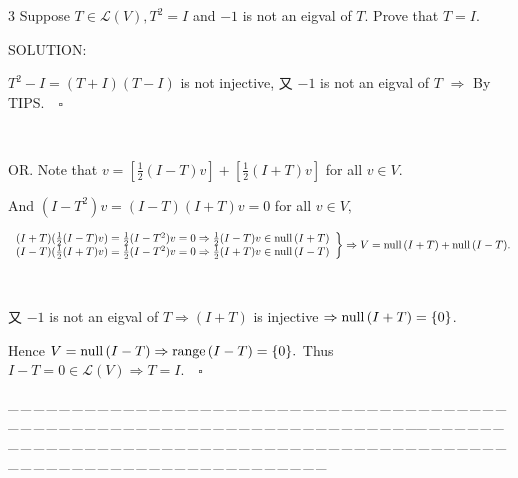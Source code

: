 \documentclass[a4paper, 11pt, UTF8]{article}
\def\range{\textup{range}\,}
\def\null{\textup{null\,}}
\def\Lm{\mathcal{L}}
\begin{document}
\begin{large}
{\timesbf\Large 3} {\timessl\Large 
Suppose $T\in\Lm(V),T^2=I$ and $-1$ is not an eigval of $T.$ Prove that $T=I.$
}\par
{\timesbf S\footnotesize{OLUTION:}}\par\quad
$T^2-I=(T+I)(T-I)$ is not injective, 又 $-1$ is not an eigval of $T$ $\Rightarrow$ By T{\small IPS}.$\quad\square$\par{\tiny\,\par}\quad
O{\small R.} Note that $v=[\frac{1}{2}(I-T)v]+[\frac{1}{2}(I+T)v]$ for all $v\in V.$\par\quad
And $(I-T^2)v=(I-T)(I+T)v=0$ for all $v\in V,$\par\quad
$\left.\begin{array}{l}
(I+T)(\frac{1}{2}(I-T)v)=\frac{1}{2}(I-T^2)v=0\Rightarrow \frac{1}{2}(I-T)v\in\null(I+T)\\
(I-T)(\frac{1}{2}(I+T)v)=\frac{1}{2}(I-T^2)v=0\Rightarrow \frac{1}{2}(I+T)v\in\null(I-T)
\end{array}\right\}\Rightarrow V=\null(I+T)+\null(I-T).$\par{\tiny\,\par}\quad
又 $-1$ is not an eigval of $T\Rightarrow (I+T)$ is injective $\Rightarrow\null(I+T)=\{0\}$.\par\quad
Hence $V=\null(I-T)\Rightarrow\range(I-T)=\{0\}.$ Thus $I-T=0\in\Lm(V)\Rightarrow T=I.\quad\square$\par
{\tiny \_\,\_\,\_\,\_\,\_\,\_\,\_\,\_\,\_\,\_\,\_\,\_\,\_\,\_\,\_\,\_\,\_\,\_\,\_\,\_\,\_\,\_\,\_\,\_\,\_\,\_\,\_\,\_\,\_\,\_\,\_\,\_\,\_\,\_\,\_\,\_\,\_\,\_\,\_\,\_\,\_\,\_\,\_\,\_\,\_\,\_\,\_\,\_\,\_\,\_\,\_\,\_\,\_\,\_\,\_\,\_\,\_\,\_\,\_\,\_\,\_\,\_\,\_\,\_\,\_\,\_\,\_\,\_\,\_\,\_\,\_\_\,\_\,\_\,\_\,\_\,\_\,\_\,\_\,\_\,\_\,\_\,\_\,\_\,\_\,\_\,\_\,\_\,\_\,\_\,\_\,\_\,\_\,\_\,\_\,\_\,\_\,\_\,\_\,\_\,\_\,\_\,\_\,\_\,\_\,\_\,\_\,\_\,\_\,\_\,\_\,\_\,\_\,\_\,\_\,\_\,\_\,\_\,\_\,\_\,\_\,\_\,\_\,\_\,\_\,\_\,\_\,\_\,\_\,\_\,\_\,\_\,\_\,\_\,\_\,\_\,\_\,\_\,\_\,\_\,\_\,\_}\par


\end{large}
\end{document}
